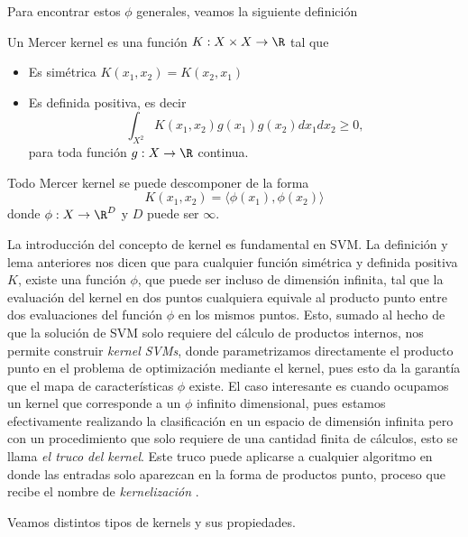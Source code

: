Para encontrar estos $\phi$ generales, veamos la siguiente definición
\begin{definition}
    Un Mercer kernel es una función $K: X\times X \to \R$ tal que
\begin{itemize}
    \item Es simétrica $K(x_1 , x_2 ) = K (x_2 , x_1)$
    \item Es definida positiva, es decir
    $$\int_{X^2} K(x_1, x_2)g(x_1) g(x_2) dx_1 dx_2\geq 0,$$
    para toda función $g:X\rightarrow\R$ continua. 
\end{itemize}

\end{definition}

\begin{lemma}
    Todo Mercer kernel se puede descomponer de la forma
\begin{equation}
    K(x_1, x_2) = \langle \phi(x_1) , \phi(x_2) \rangle
\end{equation}
donde $\phi: X \to \R^D$ y $D$ puede ser $\infty$.

\end{lemma}


\begin{remark}
La introducción del concepto de kernel es fundamental en SVM. La definición y lema anteriores nos dicen que para cualquier función simétrica y definida positiva $K$, existe una función $\phi$, que puede ser incluso de dimensión infinita, tal que la evaluación del kernel en dos puntos cualquiera equivale al producto punto entre dos evaluaciones del función $\phi$ en los mismos puntos. Esto, sumado al hecho de que la solución de SVM solo requiere del cálculo de productos internos, nos permite construir \emph{kernel SVMs}, donde parametrizamos directamente el producto punto en el problema de optimización mediante el kernel, pues esto da la garantía que el mapa de características $\phi$ existe. El caso interesante es cuando ocupamos un kernel que corresponde a un $\phi$ infinito dimensional, pues estamos efectivamente realizando la clasificación en un espacio de dimensión infinita pero con un procedimiento que solo requiere de una cantidad finita de cálculos, esto se llama \emph{el truco del kernel}. Este truco puede aplicarse a cualquier algoritmo en donde las entradas solo aparezcan en la forma de productos punto, proceso que recibe el nombre de \emph{kernelización  }. 
\end{remark}


 Veamos distintos tipos de kernels y sus propiedades.

